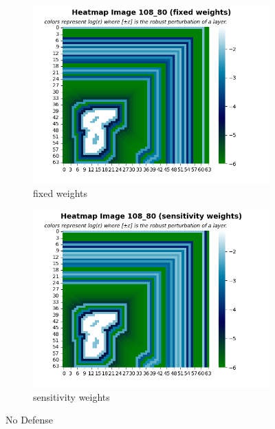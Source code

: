     \begin{figure}
         \centering
         \begin{subfigure}[b]{0.4\textwidth}
             \centering
             \includegraphics[width=\textwidth]{no_defense_fixed_weights.png}
             \caption{fixed weights}
             \label{sub-fig:No defense FW}
         \end{subfigure}
         \hfill
         \begin{subfigure}[b]{0.4\textwidth}
             \centering
             \includegraphics[width=\textwidth]{no_defense_sensitivity_weights.png}
             \caption{sensitivity weights}
             \label{sub-fig:No defense SW}
         \end{subfigure}
         \caption{No Defense}
         \label{fig:No defense}
     \end{figure}
